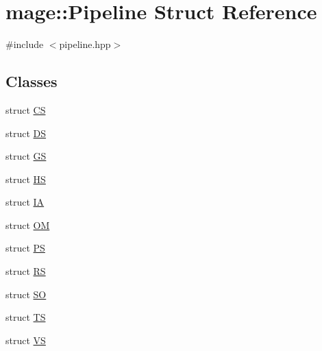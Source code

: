 \hypertarget{structmage_1_1_pipeline}{}\section{mage\+:\+:Pipeline Struct Reference}
\label{structmage_1_1_pipeline}


{\ttfamily \#include $<$pipeline.\+hpp$>$}

\subsection*{Classes}
\begin{DoxyCompactItemize}
\item 
struct \hyperlink{structmage_1_1_pipeline_1_1_c_s}{CS}
\item 
struct \hyperlink{structmage_1_1_pipeline_1_1_d_s}{DS}
\item 
struct \hyperlink{structmage_1_1_pipeline_1_1_g_s}{GS}
\item 
struct \hyperlink{structmage_1_1_pipeline_1_1_h_s}{HS}
\item 
struct \hyperlink{structmage_1_1_pipeline_1_1_i_a}{IA}
\item 
struct \hyperlink{structmage_1_1_pipeline_1_1_o_m}{OM}
\item 
struct \hyperlink{structmage_1_1_pipeline_1_1_p_s}{PS}
\item 
struct \hyperlink{structmage_1_1_pipeline_1_1_r_s}{RS}
\item 
struct \hyperlink{structmage_1_1_pipeline_1_1_s_o}{SO}
\item 
struct \hyperlink{structmage_1_1_pipeline_1_1_t_s}{TS}
\item 
struct \hyperlink{structmage_1_1_pipeline_1_1_v_s}{VS}
\end{DoxyCompactItemize}

